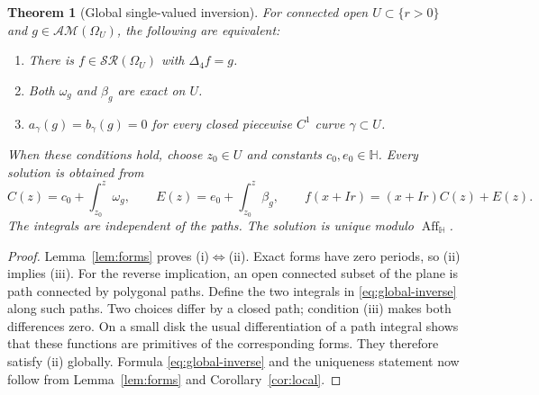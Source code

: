 \documentclass[11pt,a4paper]{article}
\numberwithin{equation}{section}
\newtheorem{theorem}{Theorem}[section]
\theoremstyle{definition}
\theoremstyle{remark}
\newcommand{\HH}{\mathbb H}
\newcommand{\SR}{\mathcal{SR}}
\newcommand{\AM}{\mathcal{AM}}
\newcommand{\Aff}{\operatorname{Aff}_{\HH}}
\newcommand{\Fu}{\Delta_4}
\begin{document}
\begin{theorem}[Global single-valued inversion]\label{thm:period}
For connected open $U\subset\{r>0\}$ and $g\in\AM(\Omega_U)$, the
following are equivalent:
\begin{enumerate}[label=\textup{(\roman*)}]
\item There is $f\in\SR(\Omega_U)$ with $\Fu f=g$.
\item Both $\omega_g$ and $\beta_g$ are exact on $U$.
\item $a_\gamma(g)=b_\gamma(g)=0$ for every closed piecewise $C^1$ curve
$\gamma\subset U$.
\end{enumerate}
When these conditions hold, choose $z_0\in U$ and constants $c_0,e_0\in\HH$.
Every solution is obtained from
\begin{equation}
 C(z)=c_0+\int_{z_0}^{z}\omega_g,\qquad
 E(z)=e_0+\int_{z_0}^{z}\beta_g,\qquad
 f(x+Ir)=(x+Ir)C(z)+E(z).\label{eq:global-inverse}
\end{equation}
The integrals are independent of the paths. The solution is unique modulo
$\Aff$.
\end{theorem}
\begin{proof}
Lemma~\ref{lem:forms} proves (i)$\Leftrightarrow$(ii). Exact forms have
zero periods, so (ii) implies (iii). For the reverse implication, an open
connected subset of the plane is path connected by polygonal paths.
Define the two integrals in \eqref{eq:global-inverse} along such paths.
Two choices differ by a closed path; condition (iii) makes both differences
zero. On a small disk the usual differentiation of a path integral shows
that these functions are primitives of the corresponding forms.
They therefore satisfy (ii) globally. Formula \eqref{eq:global-inverse}
and the uniqueness statement now follow from Lemma~\ref{lem:forms} and
Corollary~\ref{cor:local}.
\end{proof}
\end{document}
